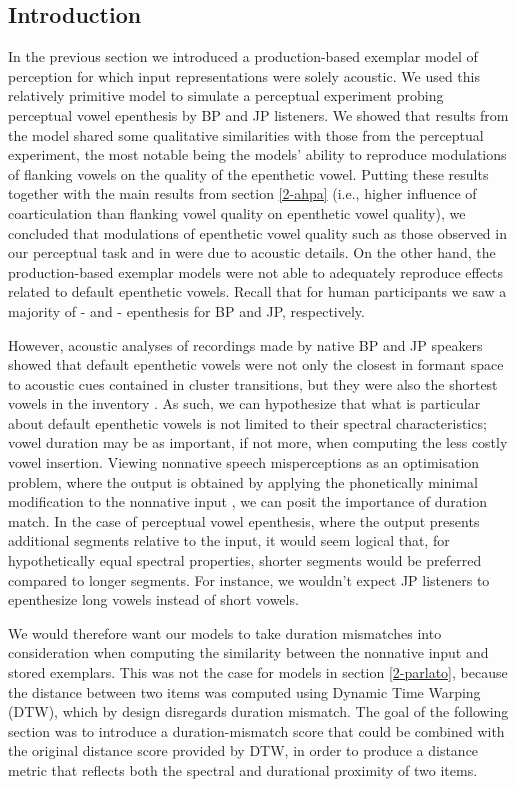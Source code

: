 \subsection{Introduction}
In the previous section we introduced a production-based exemplar model of perception for which input representations were solely acoustic. We used this relatively primitive model to simulate a perceptual experiment probing perceptual vowel epenthesis by BP and JP listeners. We showed that results from the model shared some qualitative similarities with those from the perceptual experiment, the most notable being the models' ability to reproduce modulations of flanking vowels on the quality of the epenthetic vowel. Putting these results together with the main results from section \ref{2-ahpa} (i.e., higher influence of coarticulation than flanking vowel quality on epenthetic vowel quality), we concluded that modulations of epenthetic vowel quality such as those observed in our perceptual task and in \cite{dupoux2011} were due to acoustic details.
On the other hand, the production-based exemplar models were not able to adequately reproduce effects related to default epenthetic vowels. Recall that for human participants we saw a majority of - and - epenthesis for BP and JP, respectively.

However, acoustic analyses of recordings made by native BP and JP speakers showed that default epenthetic vowels were not only the closest in formant space to acoustic cues contained in cluster transitions, but they were also the shortest vowels in the inventory . As such, we can hypothesize that what is particular about default epenthetic vowels is not limited to their spectral characteristics; vowel duration may be as important, if not more, when computing the less costly vowel insertion. Viewing nonnative speech misperceptions as an optimisation problem, where the output is obtained by applying the phonetically minimal modification to the nonnative input \cite{peperkamp2003, dupoux2011, steriade2001}, we can posit the importance of duration match. In the case of perceptual vowel epenthesis, where the output presents additional segments relative to the input, it would seem logical that, for hypothetically equal spectral properties, shorter segments would be preferred compared to longer segments. For instance, we wouldn't expect JP listeners to epenthesize long vowels instead of short vowels.

We would therefore want our models to take duration mismatches into consideration when computing the similarity between the nonnative input and stored exemplars. This was not the case for models in section \ref{2-parlato}, because the distance between two items was computed using Dynamic Time Warping (DTW), which by design disregards duration mismatch. The goal of the following section was to introduce a duration-mismatch score that could be combined with the original distance score provided by DTW, in order to produce a distance metric that reflects both the spectral and durational proximity of two items.

